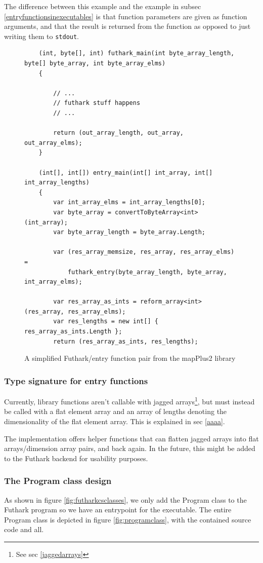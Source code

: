 The difference between this example and the example in subsec
\ref{entryfunctionsinexecutables} is that function parameters are given as
function arguments, and that the result is returned from the function as opposed
to just writing them to \texttt{stdout}.
\begin{figure}[H]
  \centering
\begin{verbatim}
    (int, byte[], int) futhark_main(int byte_array_length, byte[] byte_array, int byte_array_elms)
    {

        // ...
        // futhark stuff happens
        // ...

        return (out_array_length, out_array, out_array_elms);
    }

    (int[], int[]) entry_main(int[] int_array, int[] int_array_lengths)
    {
        var int_array_elms = int_array_lengths[0];
        var byte_array = convertToByteArray<int>(int_array);
        var byte_array_length = byte_array.Length;

        var (res_array_memsize, res_array, res_array_elms) =
            futhark_entry(byte_array_length, byte_array, int_array_elms);

        var res_array_as_ints = reform_array<int>(res_array, res_array_elms);
        var res_lengths = new int[] { res_array_as_ints.Length };
        return (res_array_as_ints, res_lengths);
\end{verbatim}
  \caption{A simplified Futhark/entry function pair from the mapPlus2 library}
  \label{fig:futharkentrypairlib}
\end{figure}

\subsubsection{Type signature for entry functions}
Currently, library functions aren't callable with jagged arrays\footnote{See sec
\ref{jaggedarrays}}, but must instead be called with a flat element array and an
array of lengths denoting the dimensionality of the flat element array. This is
explained in sec \ref{aaaa}.

The \fshark{} implementation offers helper functions that can flatten jagged
arrays into flat arrays/dimension array pairs, and back again.
In the future, this might be added to the Futhark \csharp{} backend for
usability purposes.

\clearpage

\subsubsection{The Program class design}
As shown in figure \ref{fig:futharkcsclasses}, we only add the Program class to
the Futhark program so we have an entrypoint for the executable.
The entire Program class is depicted in figure \ref{fig:programclass}, with the
contained source code and all.

